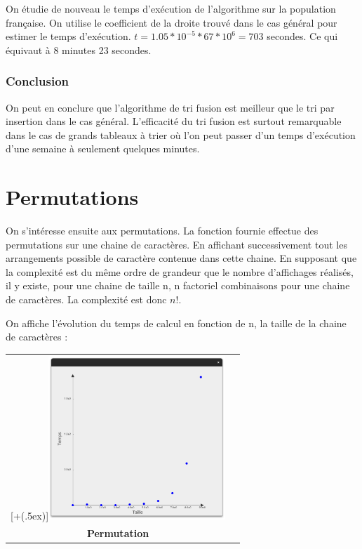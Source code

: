 \documentclass[12pt]{article}
\newcommand*{\addheight}[2][.5ex]{%
  \raisebox{0pt}[\dimexpr\height+(#1)\relax]{#2}%
}
\begin{document}
On étudie de nouveau le temps d'exécution de l'algorithme sur la population française.
On utilise le coefficient de la droite trouvé dans le cas général pour estimer le temps d'exécution. $ t = 1.05*10^{-5} * 67*10^6 = 703 $ secondes. Ce qui équivaut à 8 minutes 23 secondes.

\subsubsection*{Conclusion}

On peut en conclure que l'algorithme de tri fusion est meilleur que le tri par insertion dans le cas général. L'efficacité du tri fusion est surtout remarquable dans le cas de grands tableaux à trier où l'on peut passer d'un temps d'exécution d'une semaine à seulement quelques minutes.


\section{Permutations}

On s'intéresse ensuite aux permutations.
La fonction fournie effectue des permutations sur une chaine de caractères. En affichant successivement tout les arrangements possible de caractère contenue dans cette chaine.
En supposant que la complexité est du même ordre de grandeur que le nombre d'affichages réalisés, il y existe, pour une chaine de taille n, n factoriel combinaisons pour une chaine de caractères. La complexité est donc $n!$.


On affiche l'évolution du temps de calcul en fonction de n, la taille de la chaine de caractères :

\begin{tabular}[H]{c c}
    \addheight{\includegraphics[width=18em]{permu.png}}  & \\
    \small \textbf{Permutation} & \\
\end{tabular}
\end{document}
